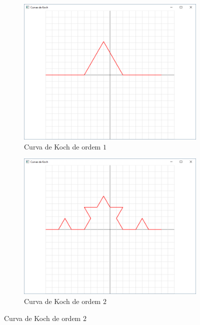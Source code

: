 \begin{enumerate}
\begin{enumerate}
        \label{ex:cap04_ex3a}

          \begin{figure}[!htp]
          \centering
          \begin{subfigure}[t]{0.4\textwidth}
              \centerline{\includegraphics[width=.9\textwidth]{img/cap4_ex14}}
              \caption{Curva de Koch de ordem $1$}
              \label{fig:cap03_ex14a}
          \end{subfigure}
          \hfill
          \begin{subfigure}[t]{0.4\textwidth}
              \centerline{\includegraphics[width=.9\textwidth]{img/cap4_ex14b}}
              \caption{Curva de Koch de ordem $2$}
              \label{fig:cap03_ex14b}
          \end{subfigure}
          \hfill

\end{figure}
\end{enumerate}
\end{enumerate}
